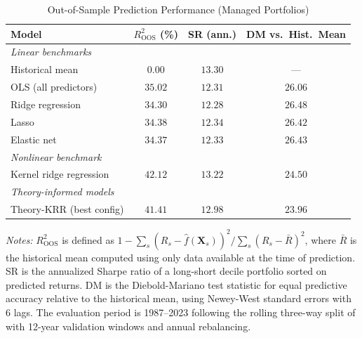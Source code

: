 \begin{table}[H]
\centering
\caption{Out-of-Sample Prediction Performance (Managed Portfolios)}
\label{tab:oos_performance}
\small
\begin{tabular}{lccc}
\toprule
Model & $R^2_{\text{OOS}}$ (\%) & SR (ann.) & DM vs.\ Hist.\ Mean \\
\midrule
\multicolumn{4}{l}{\textit{Linear benchmarks}} \\
Historical mean                & $0.00$ & $13.30$ & --- \\
OLS (all predictors)           & $35.02$ & $12.31$ & $26.06$ \\
Ridge regression               & $34.30$ & $12.28$ & $26.48$ \\
Lasso                          & $34.38$ & $12.34$ & $26.42$ \\
Elastic net                    & $34.37$ & $12.33$ & $26.43$ \\
\multicolumn{4}{l}{\textit{Nonlinear benchmark}} \\
Kernel ridge regression        & $42.12$ & $13.22$ & $24.50$ \\[4pt]
\multicolumn{4}{l}{\textit{Theory-informed models}} \\
Theory-KRR (best config)       & $41.41$ & $12.98$ & $23.96$ \\[4pt]
\bottomrule
\end{tabular}
\begin{minipage}{\textwidth}
\vspace{4pt}
\footnotesize
\textit{Notes:} $R^2_{\text{OOS}}$ is defined as $1 - \sum_s (R_s - \hat{f}(\mathbf{X}_s))^2 / \sum_s (R_s - \bar{R})^2$, where $\bar{R}$ is the historical mean computed using only data available at the time of prediction. SR is the annualized Sharpe ratio of a long-short decile portfolio sorted on predicted returns. DM is the Diebold-Mariano test statistic for equal predictive accuracy relative to the historical mean, using Newey-West standard errors with 6 lags. The evaluation period is 1987--2023 following the rolling three-way split of \citet{gu2020empirical} with 12-year validation windows and annual rebalancing.
\end{minipage}
\end{table}